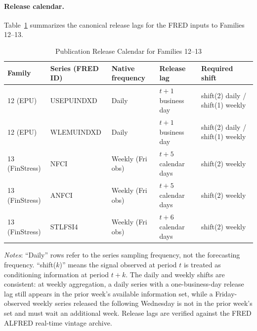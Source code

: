 \documentclass[12pt,a4paper]{article}
\begin{document}
\paragraph{Release calendar.} Table~\ref{tab:pub_delay_calendar} summarizes the canonical release lags for the FRED inputs to Families 12--13.

\begin{table}[H]
\centering
\small
\caption{Publication Release Calendar for Families 12--13}
\label{tab:pub_delay_calendar}
\begin{threeparttable}
\begin{tabular}{@{}lllll@{}}
\toprule
Family & Series (FRED ID) & Native frequency & Release lag & Required shift \\
\midrule
12 (EPU) & USEPUINDXD & Daily & $t+1$ business day & shift(2) daily / shift(1) weekly \\
12 (EPU) & WLEMUINDXD & Daily & $t+1$ business day & shift(2) daily / shift(1) weekly \\
13 (FinStress) & NFCI & Weekly (Fri obs) & $t+5$ calendar days & shift(2) weekly \\
13 (FinStress) & ANFCI & Weekly (Fri obs) & $t+5$ calendar days & shift(2) weekly \\
13 (FinStress) & STLFSI4 & Weekly (Fri obs) & $t+6$ calendar days & shift(2) weekly \\
\bottomrule
\end{tabular}
\begin{tablenotes}
\small
\item \textit{Notes}: ``Daily'' rows refer to the series sampling frequency, not the forecasting frequency. ``shift($k$)'' means the signal observed at period $t$ is treated as conditioning information at period $t+k$. The daily and weekly shifts are consistent: at weekly aggregation, a daily series with a one-business-day release lag still appears in the prior week's available information set, while a Friday-observed weekly series released the following Wednesday is not in the prior week's set and must wait an additional week. Release lags are verified against the FRED ALFRED real-time vintage archive.
\end{tablenotes}
\end{threeparttable}
\end{table}
\end{document}
